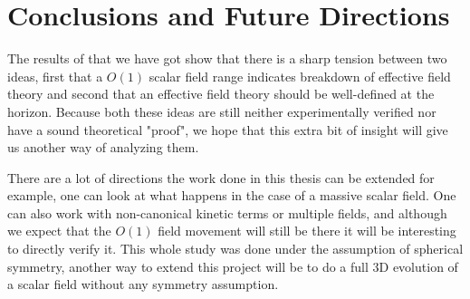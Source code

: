 \chapter{Conclusions and Future Directions}

The results of that we have got show that there is a sharp tension between two ideas, first that a $O(1)$ scalar field range indicates breakdown of effective field theory and second that an effective field theory should be well-defined at the horizon. Because both these ideas are still neither experimentally verified nor have a sound theoretical "proof", we hope that this extra bit of insight will give us another way of analyzing them.

There are a lot of directions the work done in this thesis can be extended for example, one can look at what happens in the case of a massive scalar field. One can also work with non-canonical kinetic terms or multiple fields, and although we expect that the $O(1)$ field movement will still be there it will be interesting to directly verify it.
This whole study was done under the assumption of spherical symmetry, another way to extend this project will be to do a full 3D evolution of a scalar field without any symmetry assumption.